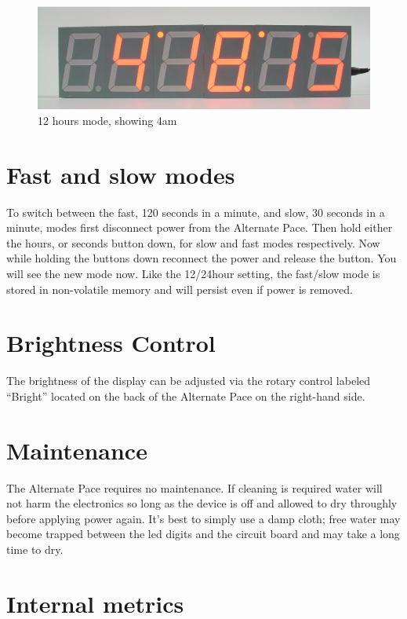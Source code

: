 \documentclass{article}
\begin{document}
\begin{figure}
\centering
\includegraphics[width=4.75in]{figures/front-running-12hr-am.eps}
\caption{12 hours mode, showing 4am}
\label{fig:front-running-12hr-am}
\end{figure}

\section{Fast and slow modes}

To switch between the fast, 120 seconds in a minute, and slow, 30 seconds in a
minute, modes first disconnect power from the Alternate Pace. Then hold either
the hours, or seconds button down, for slow and fast modes respectively. Now
while holding the buttons down reconnect the power and release the button. You
will see the new mode now. Like the 12/24hour setting, the fast/slow mode is
stored in non-volatile memory and will persist even if power is removed.

\section{Brightness Control}

The brightness of the display can be adjusted via the rotary control labeled
``Bright'' located on the back of the Alternate Pace on the right-hand side.

\section{Maintenance}

The Alternate Pace requires no maintenance. If cleaning is required water
will not harm the electronics so long as the device is off and allowed to dry
throughly before applying power again. It's best to simply use a damp cloth;
free water may become trapped between the led digits and the circuit board and
may take a long time to dry.

\pagebreak

\section{Internal metrics}
\end{document}
